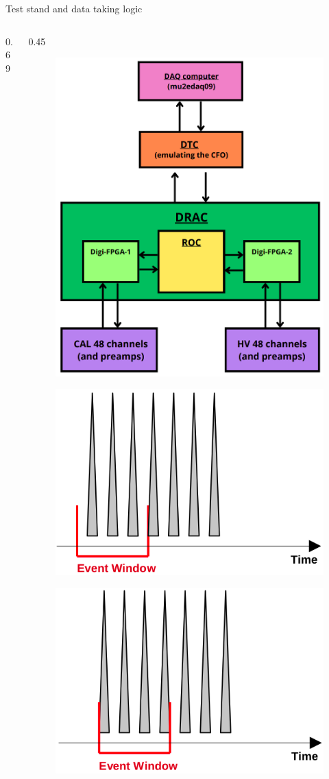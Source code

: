 \documentclass{beamer}
\begin{document}
\begin{frame}{Test stand and data taking logic}
\begin{columns}
\begin{column}{0.69\framewidth}
\begin{itemize}
{}
      \end{itemize}
          \end{column}
\begin{column}{0.45\framewidth}
        \begin{figure}[h]
          \centering
            \includegraphics[width=0.7\columnwidth]{figures/png/Screenshot_20240712_102528.png}
          \label{fig:enter-label} 
      \end{figure} 
      \vspace{-4mm}
      \begin{figure}[H]
        \centering
        \includegraphics[width=0.55\columnwidth]{figures/png/Screenshot_20241013_113750.png}
        \label{fig:enter-label} 
    \end{figure}
    \vspace{-5mm}
      \begin{figure}[H]
        \centering
        \includegraphics[width=0.55\columnwidth]{figures/png/Screenshot_20241013_113809.png}

\end{figure}
\end{column}
\end{columns}
\end{frame}
\end{document}
